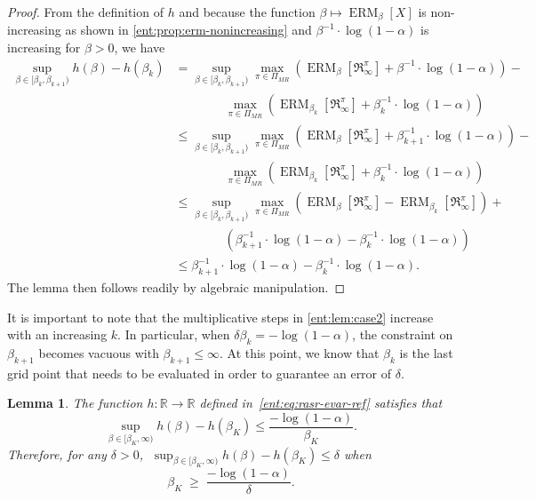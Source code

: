 \documentclass[twoside]{article}
\newcommand{\erm}[2]{\operatorname{ERM}_{#1}\left[#2\right]}
\newcommand{\Real}{\mathbb{R}}
\theoremstyle{plain}
\newtheorem{lemma}[theorem]{Lemma}
\theoremstyle{definition}
\theoremstyle{remark}
\begin{document}
\begin{proof}
From the definition of $h$ and because the function $\beta\mapsto \erm{\beta}{X}$ is non-increasing as shown in \cref{ent:prop:erm-nonincreasing} and $\beta^{-1}\cdot \log (1-\alpha)$ is increasing for $\beta>0$, we have
\begin{align*}
\sup_{\beta \in [\beta_k,\beta_{k+1})} h(\beta) - h(\beta_k)
    &= \sup_{\beta\in [\beta_k,\beta_{k+1})} \max_{\pi\in \Pi_{MR}}  \left(  \erm{\beta}{\mathfrak{R}_{\infty}^{\pi}} + \beta^{-1}\cdot \log (1-\alpha) \right) - \\
      &\qquad\qquad  \max_{\pi\in \Pi_{MR}}  \left(  \erm{\beta_k}{\mathfrak{R}_{\infty}^{\pi}} + \beta_k^{-1}\cdot \log (1-\alpha) \right) \\
    &\le \sup_{\beta\in [\beta_k,\beta_{k+1})} \max_{\pi\in \Pi_{MR}}  \left(  \erm{\beta}{\mathfrak{R}_{\infty}^{\pi}} + \beta_{k+1}^{-1}\cdot \log (1-\alpha) \right) - \\
    &\qquad \qquad \max_{\pi\in \Pi_{MR}}  \left( \erm{\beta_k}{\mathfrak{R}_{\infty}^{\pi}} + \beta_k^{-1}\cdot \log (1-\alpha) \right) \\
    &\le \sup_{\beta\in [\beta_k,\beta_{k+1})} \max_{\pi\in \Pi_{MR}}  \left(  \erm{\beta}{\mathfrak{R}_{\infty}^{\pi}}  - \erm{\beta_k}{\mathfrak{R}_{\infty}^{\pi}} \right) + \\
    &\qquad  \qquad \left(\beta_{k+1}^{-1}\cdot \log (1-\alpha)  - \beta_k^{-1}\cdot \log (1-\alpha) \right) \\
&\le  \beta_{k+1}^{-1}\cdot \log (1-\alpha)  - \beta_k^{-1}\cdot \log (1-\alpha) .
\end{align*}
%
The lemma then follows readily by algebraic manipulation. 
\end{proof}

It is important to note that the multiplicative steps in \cref{ent:lem:case2} increase with an increasing $k$. In particular, when $\delta\beta_k = -\log (1-\alpha)$, the constraint on $\beta_{k+1}$ becomes vacuous with $\beta_{k+1} \le \infty$. At this point, we know that $\beta_k$ is the last grid point that needs to be evaluated in order to guarantee an error of $\delta$. 

\begin{lemma} \label{ent:lem:case3}
The function $h\colon\Real \to \Real$ defined in~\eqref{ent:eq:rasr-evar-ref} satisfies that
  \[
    \sup_{\beta\in [\beta_K, \infty)} h(\beta) - h(\beta_K) \le \frac{-\log (1-\alpha)}{\beta_K}.
  \]
Therefore, for any $\delta > 0$, $\;\sup_{\beta\in [\beta_K, \infty)} h(\beta) - h(\beta_K) \le \delta$ when
  \[
   \beta_K \;\ge\; \frac{-\log (1-\alpha)}{\delta}.  
  \]
\end{lemma}
\end{document}
